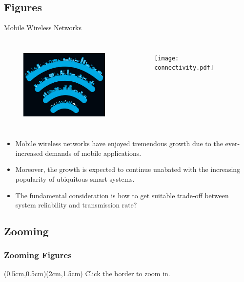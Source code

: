 \subsection{Figures}
\begin{frame}{Mobile Wireless Networks}
\begin{columns}[c]
  \column{2in}
  \begin{figure}
    \includegraphics[width=2.0in]{MOT_WNS.pdf}
   \label{connectivity}
  \end{figure}
  \column{2in}
  \begin{figure}
    \texttt{[image: connectivity.pdf]}
  \label{MOT_WNS}
  \end{figure}
\end{columns}
\begin{itemize}
  \item Mobile wireless networks have enjoyed tremendous growth due to the ever-increased demands of mobile applications.
  \item Moreover, the growth is expected to continue unabated with the increasing popularity of ubiquitous smart systems.
  \item The fundamental consideration is how to get suitable trade-off between system reliability and transmission rate?
\end{itemize}
\end{frame}

\subsection{Zooming}
\begin{frame}
\frametitle{Zooming Figures}
(0.5cm,0.5cm)(2cm,1.5cm)
Click the border to zoom in.
\end{frame}

